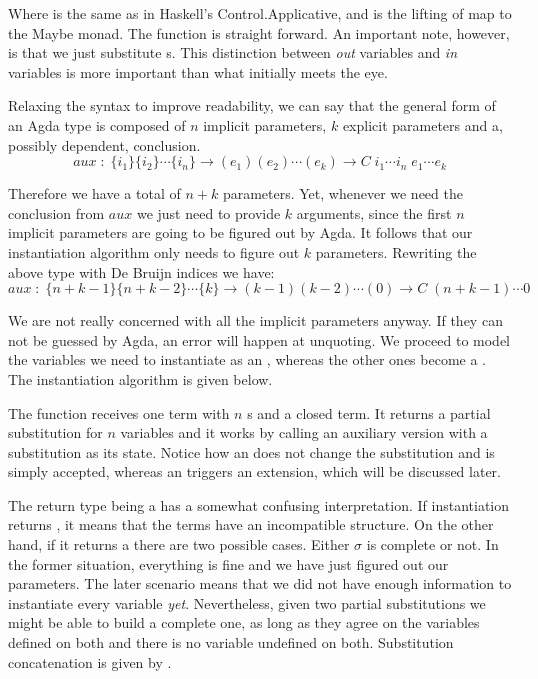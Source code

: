 Where \F{$\_<\$>\_$} is the same as in Haskell's Control.Applicative, and  is the lifting of map to the Maybe monad. The  function is straight forward. An important note, however, is that we just substitute s. This distinction between \emph{out} variables and \emph{in} variables is more important than what initially meets the eye. 

Relaxing the syntax to improve readability, we can say that the general form of an Agda type is composed of $n$ implicit parameters, $k$ explicit parameters and a, possibly dependent, conclusion.
\[
aux\;:\;\{ i_1 \}\{ i_2 \} \cdots \{ i_n \} \rightarrow ( e_1 )( e_2) \cdots (e_k) \rightarrow C\;i_1\cdots i_n\;e_1\cdots e_k
\]

Therefore we have a total of $n+k$ parameters. Yet, whenever we need the conclusion from $aux$ we just need to provide $k$ arguments, since the first
$n$ implicit parameters are going to be figured out by Agda. It follows that our instantiation algorithm only needs to figure out $k$ parameters. Rewriting the above type with De Bruijn indices we have:
\[
aux\;:\;\{ n+k - 1 \}\{ n+k - 2\} \cdots \{ k \} \rightarrow (k-1)(k-2) \cdots (0) \rightarrow C\;(n+k - 1) \cdots 0
\]

We are not really concerned with all the implicit parameters anyway. If they can not be guessed by Agda, an error will happen at unquoting. We proceed to
model the variables we need to instantiate as an , whereas the other ones become a . The instantiation algorithm is given below. 


The  function receives one term with $n$ s and a closed term. It returns a partial substitution for $n$ variables and it works by calling an auxiliary version with a substitution as its state. Notice how an  does not change the substitution and is simply accepted, whereas an  triggers an extension, which will be discussed later.

The return type being a  has a somewhat confusing interpretation. If instantiation returns , it means that the terms have an incompatible structure. On the other hand, if it returns a  there are two possible cases. Either $\sigma$ is complete or not. In the former situation, everything is fine and we have just figured out our parameters. The later scenario means that we did not have enough information to instantiate every variable \emph{yet}. Nevertheless, given two partial substitutions we might be able to build a complete one, as long as they agree on the variables defined on both and there is no variable undefined on both. Substitution concatenation is given by .

